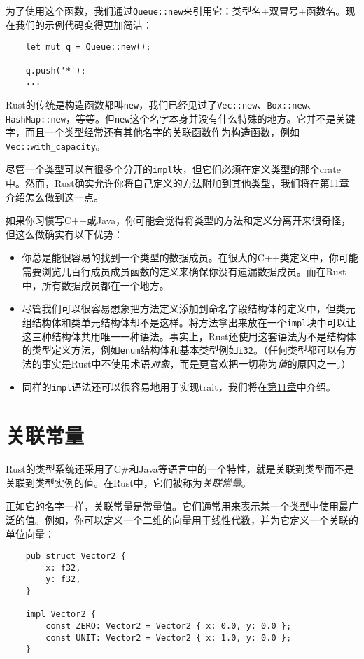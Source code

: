 为了使用这个函数，我们通过\texttt{Queue::new}来引用它：类型名+双冒号+函数名。现在我们的示例代码变得更加简洁：
\begin{verbatim}
    let mut q = Queue::new();

    q.push('*');
    ...
\end{verbatim}

Rust的传统是构造函数都叫\texttt{new}，我们已经见过了\texttt{Vec::new}、\texttt{Box::new}、\texttt{HashMap::new}，等等。但\texttt{new}这个名字本身并没有什么特殊的地方。它并不是关键字，而且一个类型经常还有其他名字的关联函数作为构造函数，例如\texttt{Vec::with\_capacity}。

尽管一个类型可以有很多个分开的\texttt{impl}块，但它们必须在定义类型的那个crate中。然而，Rust确实允许你将自己定义的方法附加到其他类型，我们将在\hyperref[ch11]{第11章}介绍怎么做到这一点。

如果你习惯写C++或Java，你可能会觉得将类型的方法和定义分离开来很奇怪，但这么做确实有以下优势：
\begin{itemize}
    \item 你总是能很容易的找到一个类型的数据成员。在很大的C++类定义中，你可能需要浏览几百行成员成员函数的定义来确保你没有遗漏数据成员。而在Rust中，所有数据成员都在一个地方。
    \item 尽管我们可以很容易想象把方法定义添加到命名字段结构体的定义中，但类元组结构体和类单元结构体却不是这样。将方法拿出来放在一个\texttt{impl}块中可以让这三种结构体共用唯一一种语法。事实上，Rust还使用这套语法为不是结构体的类型定义方法，例如\texttt{enum}结构体和基本类型例如\texttt{i32}。（任何类型都可以有方法的事实是Rust中不使用术语\emph{对象}，而是更喜欢把一切称为\emph{值}的原因之一。）
    \item 同样的\texttt{impl}语法还可以很容易地用于实现trait，我们将在\hyperref[ch11]{第11章}中介绍。
\end{itemize}

\section{关联常量}
Rust的类型系统还采用了C\#和Java等语言中的一个特性，就是关联到类型而不是关联到类型实例的值。在Rust中，它们被称为\emph{关联常量}。

正如它的名字一样，关联常量是常量值。它们通常用来表示某一个类型中使用最广泛的值。例如，你可以定义一个二维的向量用于线性代数，并为它定义一个关联的单位向量：
\begin{verbatim}
    pub struct Vector2 {
        x: f32,
        y: f32,
    }

    impl Vector2 {
        const ZERO: Vector2 = Vector2 { x: 0.0, y: 0.0 };
        const UNIT: Vector2 = Vector2 { x: 1.0, y: 0.0 };
    }
\end{verbatim}

